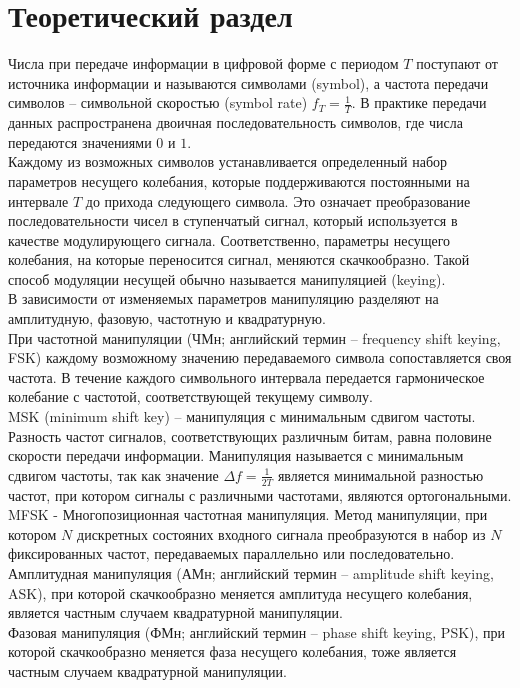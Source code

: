 \documentclass[a4paper]{article}
\begin{document}
\section{Теоретический раздел}
Числа при передаче информации в цифровой форме с периодом $T$ поступают от источника информации и называются символами (symbol), а частота передачи символов -- символьной скоростью (symbol rate) $f_T = \frac{1}{T}$. В практике передачи данных распространена двоичная последовательность символов, где числа передаются значениями $0$ и $1$.\\
Каждому из возможных символов устанавливается определенный набор параметров несущего колебания, которые поддерживаются постоянными на интервале $T$ до прихода следующего символа. Это означает преобразование последовательности чисел в ступенчатый сигнал, который используется в качестве модулирующего сигнала. Соответственно, параметры несущего колебания, на которые переносится сигнал, меняются скачкообразно. Такой способ модуляции несущей обычно называется манипуляцией (keying).\\
В зависимости от изменяемых параметров манипуляцию разделяют на амплитудную, фазовую, частотную и квадратурную.\\
При частотной манипуляции (ЧМн; английский термин -- frequency shift keying, FSK) каждому возможному значению передаваемого символа сопоставляется своя частота. В течение каждого символьного интервала передается гармоническое колебание с частотой, соответствующей текущему символу.\\
MSK (minimum shift key) -- манипуляция с минимальным сдвигом частоты. Разность частот сигналов, соответствующих различным битам, равна половине скорости передачи информации. Манипуляция называется с минимальным сдвигом частоты, так как значение $\Delta f = \frac{1}{2T}$ является минимальной разностью частот, при котором сигналы с различными частотами, являются ортогональными.\\
MFSK - Многопозиционная частотная манипуляция. Метод манипуляции, при котором $N$ дискретных состояних входного сигнала преобразуются в набор из $N$ фиксированных частот, передаваемых параллельно или последовательно.\\
Амплитудная манипуляция (АМн; английский термин -- amplitude shift keying, ASK), при которой скачкообразно меняется амплитуда несущего колебания, является частным случаем квадратурной манипуляции.\\
Фазовая манипуляция (ФМн; английский термин -- phase shift keying, PSK), при которой скачкообразно меняется фаза несущего колебания, тоже является частным случаем квадратурной манипуляции.\\
\end{document}
